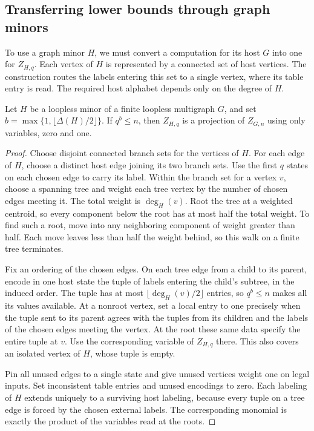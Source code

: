 \subsection{Transferring lower bounds through graph minors}

To use a graph minor \(H\), we must convert a computation for its
host \(G\) into one for \(Z_{H,q}\). Each vertex of \(H\) is represented
by a connected set of host vertices. The construction routes the labels
entering this set to a single vertex, where its table entry is read.
The required host alphabet depends only on the degree of \(H\).

\begin{lemma}\label{lem:graph-minor}
Let \(H\) be a loopless minor of a finite loopless multigraph \(G\),
and set \(b=\max\{1,\lfloor\Delta(H)/2\rfloor\}\).
If \(q^b\le n\), then \(Z_{H,q}\) is a projection of \(Z_{G,n}\)
using only variables, zero and one.
\end{lemma}

\begin{proof}
Choose disjoint connected branch sets for the vertices of \(H\).
For each edge of \(H\), choose a distinct host edge joining its two
branch sets. Use the first \(q\) states on each chosen edge to carry
its label. Within the branch set for a vertex \(v\), choose a spanning
tree and weight each tree vertex by the number of chosen edges meeting
it. The total weight is \(\deg_H(v)\). Root the tree at a weighted
centroid, so every component below the root has at most half the total
weight. To find such a root, move into any neighboring component of
weight greater than half. Each move leaves less than half the weight
behind, so this walk on a finite tree terminates.

Fix an ordering of the chosen edges. On each tree edge from a child
to its parent, encode in one host state the tuple of labels entering
the child's subtree, in the induced order. The tuple has at most
\(\lfloor\deg_H(v)/2\rfloor\) entries, so \(q^b\le n\) makes all its
values available. At a nonroot vertex, set a local entry to one
precisely when the tuple sent to its parent agrees with the tuples
from its children and the labels of the chosen edges meeting the
vertex. At the root these same data specify the entire tuple at \(v\).
Use the corresponding variable of \(Z_{H,q}\) there. This also covers
an isolated vertex of \(H\), whose tuple is empty.

Pin all unused edges to a single state and give unused vertices
weight one on legal inputs. Set inconsistent table entries and unused
encodings to zero. Each labeling of \(H\) extends uniquely to a
surviving host labeling, because every tuple on a tree edge is forced
by the chosen external labels. The corresponding monomial is exactly
the product of the variables read at the roots.
\end{proof}

